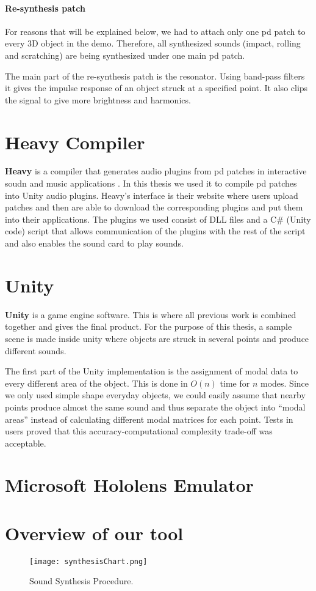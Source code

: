 \paragraph{Re-synthesis patch\\}
For reasons that will be explained below, we had to attach only one pd patch to every 3D object in the demo. Therefore, all synthesized sounds (impact, rolling and scratching) are being synthesized under one main pd patch. 

The main part of the re-synthesis patch is the resonator. Using band-pass filters it gives the impulse response of an object struck at a specified point. It also clips the signal to give more brightness and harmonics. 

\section{Heavy Compiler}
\textbf{Heavy} is a compiler that generates audio plugins from pd patches in interactive soudn and music applications \cite{bib:heavy}. In this thesis we used it to compile pd patches into Unity audio plugins. Heavy's interface is their website where users upload patches and then are able to download the corresponding plugins and put them into their applications. The plugins we used consist of DLL files and a C\# (Unity code) script that allows communication of the plugins with the rest of the script and also enables the sound card to play sounds.

\section{Unity\textregistered}
\textbf{Unity\textregistered} is a game engine software. This is where all previous work is combined together and gives the final product. For the purpose of this thesis, a sample scene is made inside unity where objects are struck in several points and produce different sounds. 

The first part of the Unity implementation is the assignment of modal data to every different area of the object. This is done in $O(n)$ time for $n$ modes. Since we only used simple shape everyday objects, we could easily assume that nearby points produce almost the same sound and thus separate the object into ``modal areas'' instead of calculating different modal matrices for each point. Tests in users proved that this accuracy-computational complexity trade-off was acceptable.  

\section{Microsoft Hololens Emulator}

\section{Overview of our tool}
\begin{figure}[H]
  \centering
    \texttt{[image: synthesisChart.png]}
      \caption{Sound Synthesis Procedure.}
      \label{fig:synth_proc}
\end{figure}